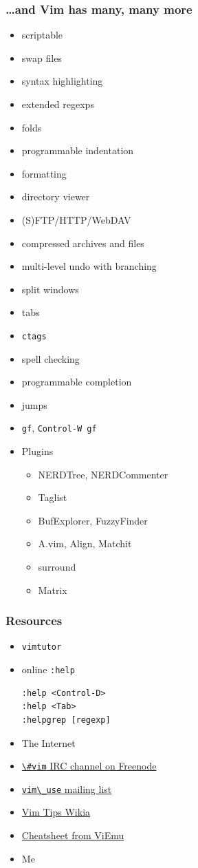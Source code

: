 \documentclass[%
        hyperref={%
                pdfauthor={Zakariyya Mughal},%
                pdfpagemode={None},pdfpagelayout={SinglePage}}%
        xcolor={x11names},%
]{beamer}
\newenvironment{indented}{\begin{adjustwidth}{1.5em}{}}{\end{adjustwidth}}
\begin{document}
\begin{frame}
\frametitle{\ldots{}and Vim has many, many more}
\begin{multicols}{2}
\begin{itemize}
\item scriptable
\item swap files
\item syntax highlighting
\item extended regexps
\item folds
\item programmable indentation
\item formatting
\item directory viewer
\item (S)FTP/HTTP/WebDAV
\item compressed archives and files
\item multi-level undo with branching
\item split windows
\item tabs
\item \Verb+ctags+
\item spell checking
\item programmable completion
\item jumps
\item \Verb+gf+, \Verb+Control-W gf+
\item Plugins
\begin{itemize}
\item NERDTree, NERDCommenter
\item Taglist
\item BufExplorer, FuzzyFinder
\item A.vim, Align, Matchit
\item surround
\item Matrix
\end{itemize}
\end{itemize}
\end{multicols}
\end{frame}

\begin{frame}[fragile]
\frametitle{Resources}
\begin{itemize}
\item \Verb+vimtutor+
\item online \Verb+:help+
\begin{indented}
\begin{Verbatim}
:help <Control-D>
:help <Tab>
:helpgrep [regexp]
\end{Verbatim}
\end{indented}
\item The Internet
\item \href{http://www.vi-improved.org/}{\Verb+\#vim+ IRC channel on Freenode}
\item \href{http://groups.google.com/group/vim_use}{\Verb+vim\_use+ mailing list}
\item \href{http://vim.wikia.com/wiki/Vim_Tips_Wiki}{Vim Tips Wikia}
\item \href{http://www.viemu.com/a_vi_vim_graphical_cheat_sheet_tutorial.html}{Cheatsheet from ViEmu}
\pause \item Me \smiley
\end{itemize}
\end{frame}
\end{document}
